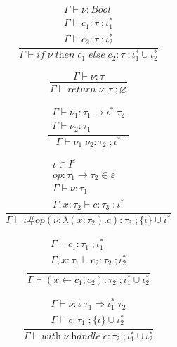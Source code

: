 \documentclass[12pt]{article}
\newcommand\eff[0]{\varepsilon}
\newcommand\eop[0]{\textit{op}}
\newcommand\insts[1]{I^{#1}}
\newcommand\inst[0]{\iota}
\newcommand\instss[0]{\inst^*}
\newcommand\type[0]{\tau}
\newcommand\tbool[0]{\textit{Bool}}
\newcommand\tarr[2]{#1 \rightarrow #2}
\newcommand\tarre[3]{#1 \rightarrow #2 \; #3}
\newcommand\thandler[4]{#1 \; #2 \Rightarrow #3 \; #4}
\newcommand\val[0]{\nu}
\newcommand\comp[0]{c}
\newcommand\cif[3]{\textit{if} \; #1 \; \textit{then} \; #2 \; \textit{else} \; #3}
\newcommand\creturn[1]{\textit{return} \; #1}
\newcommand\capp[2]{#1 \; #2}
\newcommand\copi[6]{#1 \# #2(#3 ; \lambda (#4:#5) . #6)}
\newcommand\cdo[3]{#1 \leftarrow #2 ; #3}
\newcommand\chandle[2]{\textit{with} \; #1 \; \textit{handle} \; #2}
\begin{document}
\begin{minipage}{0.5\textwidth}
\[\frac{
	\begin{array}{l}
	\Gamma \vdash \val : \tbool \\
	\Gamma \vdash \comp_1 : \type \; ; \instss_1 \\
	\Gamma \vdash \comp_2 : \type \; ; \instss_2
	\end{array}
}{
	\Gamma \vdash \cif{\val}{\comp_1}{\comp_2} : \type \; ; \instss_1 \cup \instss_2
}\]
\end{minipage}
\vspace{10pt}
\begin{minipage}{0.5\textwidth}
\[\frac{
	\begin{array}{l}
	\Gamma \vdash \val : \type
	\end{array}
}{
	\Gamma \vdash \creturn{\val} : \type \; ; \varnothing
}\]
\end{minipage}
\begin{minipage}{0.5\textwidth}
\[\frac{
	\begin{array}{l}
	\Gamma \vdash \val_1 : \tarre{\type_1}{\instss}{\type_2} \\
	\Gamma \vdash \val_2 : \type_1
	\end{array}
}{
	\Gamma \vdash \capp{\val_1}{\val_2} : \type_2 \; ; \instss
}\]
\end{minipage}
\begin{minipage}{0.5\textwidth}
\[\frac{
	\begin{array}{l}
	\inst \in \insts{\eff} \\
	\eop : \tarr{\type_1}{\type_2} \in \eff \\
	\Gamma \vdash \val : \type_1 \\
	\Gamma , x : \type_2 \vdash \comp : \type_3 \; ; \instss
	\end{array}
}{
	\Gamma \vdash \copi{\inst}{\eop}{\val}{x}{\type_2}{\comp} : \type_3 \; ; \{ \inst \} \cup \instss
}\]
\end{minipage}
\begin{minipage}{0.5\textwidth}
\[\frac{
	\begin{array}{l}
	\Gamma \vdash \comp_1 : \type_1 \; ; \instss_1 \\
	\Gamma , x : \type_1 \vdash \comp_2 : \type_2 \; ; \instss_2 \\
	\end{array}
}{
	\Gamma \vdash (\cdo{x}{\comp_1}{\comp_2}) : \type_2 \; ; \instss_1 \cup \instss_2
}\]
\end{minipage}
\begin{minipage}{0.5\textwidth}
\[\frac{
	\begin{array}{l}
	\Gamma \vdash \val : \thandler{\inst}{\type_1}{\instss_1}{\type_2} \\
	\Gamma \vdash \comp : \type_1 \; ; \{ \inst \} \cup \instss_2
	\end{array}
}{
	\Gamma \vdash \chandle{\val}{\comp} : \type_2 \; ; \instss_1 \cup \instss_2
}\]
\end{minipage}
\end{document}
